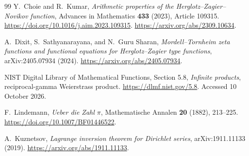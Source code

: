 \documentclass[11pt,a4paper]{article}
\theoremstyle{definition}
\theoremstyle{remark}
\numberwithin{equation}{section}
\begin{document}
\begin{thebibliography}{99}
Y.~Choie and R.~Kumar,
\emph{Arithmetic properties of the Herglotz--Zagier--Novikov function},
Advances in Mathematics \textbf{433} (2023), Article 109315.
\url{https://doi.org/10.1016/j.aim.2023.109315}.
\url{https://arxiv.org/abs/2309.10634}.

A.~Dixit, S.~Sathyanarayana, and N.~Guru Sharan,
\emph{Mordell--Tornheim zeta functions and functional equations for
Herglotz--Zagier type functions}, arXiv:2405.07934 (2024).
\url{https://arxiv.org/abs/2405.07934}.

NIST Digital Library of Mathematical Functions, Section 5.8,
\emph{Infinite products}, reciprocal-gamma Weierstrass product.
\url{https://dlmf.nist.gov/5.8}. Accessed 10 October 2026.

F.~Lindemann, \emph{Ueber die Zahl $\pi$},
Mathematische Annalen \textbf{20} (1882), 213--225.
\url{https://doi.org/10.1007/BF01446522}.

A.~Kuznetsov, \emph{Lagrange inversion theorem for Dirichlet series},
arXiv:1911.11133 (2019).
\url{https://arxiv.org/abs/1911.11133}.

\end{thebibliography}
\end{document}

